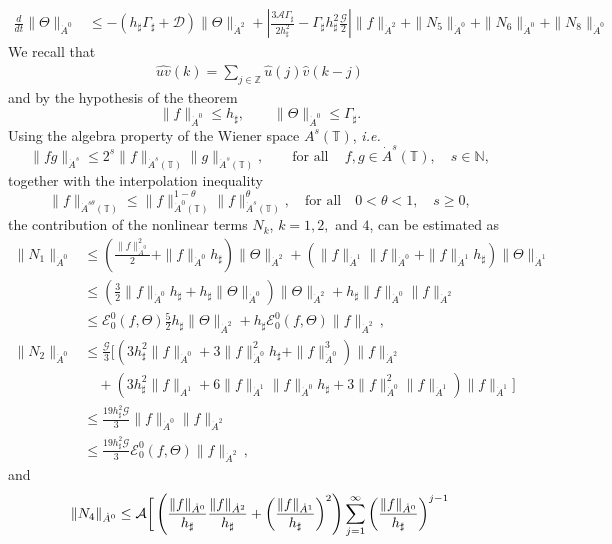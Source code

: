 \documentclass[reqno,11pt]{amsart}
\newcommand{\ZZ}{{\mathbb Z}}
\newcommand{\NN}{{\mathbb N}}
\newcommand{\TT}{{\mathbb T}}
\newcommand{\bh}{h_\sharp}
\newcommand{\bG}{\Gamma_\sharp}
\begin{document}
{\begin{align}
\frac{d}{dt}\|\Theta\|_{\dot A^0}&\leq-\left(\bh \bG+\mathcal{D}\right)\|\Theta\|_{\dot{A}^2}+\left|\frac{3\mathcal{A}\bG}{2\bh^2}-\bG\bh^2\frac{\mathcal{G}}{2}\right| \|f\|_{\dot{A}^2}+\|N_5\|_{\dot A^0}+\|N_6\|_{\dot A^0}+\|N_8\|_{\dot A^0}\label{eq:2}
\end{align}
We recall that
\begin{align*}
\widehat{uv}(k)=\sum_{j\in\ZZ}\hat{u}(j)\hat{v}(k-j)
\end{align*}
and by the hypothesis of the theorem
\[
	\|f\|_{\dot A^0}\leq \bh,\qquad \|\Theta\|_{\dot A^0}\leq \bG.
\]
Using the algebra property of the Wiener space $A^s(\TT)$, \emph{i.e.}
$$
\|fg\|_{\dot{A}^s}\leq 2^{s}\|f\|_{\dot{A}^s(\TT)}\|g\|_{\dot{A}^s(\TT)},\qquad \mbox{for all}\quad \, f,g\in \dot A^s(\TT),\quad s\in\NN,
$$
together with the interpolation inequality
$$
\|f\|_{\dot{A}^{s\theta}(\TT)}\leq \|f\|_{\dot A^0(\TT)}^{1-\theta}\|f\|_{\dot{A}^s(\TT)}^{\theta},\quad \mbox{for all} \quad 0<\theta<1,\quad s\geq0,
$$
the contribution of the nonlinear terms $N_k$, $k=1,2,$ and $4$, can be estimated as
\begin{align*}
\|N_1\|_{\dot A^0}&\leq \left(\frac{\|f\|_{\dot A^0}^2}{2}+\|f\|_{\dot A^0}\bh\right)\|\Theta\|_{\dot{A}^2}+\left(\|f\|_{\dot{A}^1}\|f\|_{\dot A^0}+\|f\|_{\dot{A}^1}\bh\right)\|\Theta\|_{\dot{A}^1}\\
&\leq \left(\frac{3}{2}\|f\|_{\dot A^0}\bh+\bh\|\Theta\|_{\dot A^0}\right)\|\Theta\|_{\dot{A}^2}+\bh\|f\|_{\dot A^0}\|f\|_{\dot{A}^2}\\
&\leq \mathscr{E}_0^0(f,\Theta) \frac{5}{2}\bh\|\Theta\|_{\dot{A}^2}+\bh\mathscr{E}_0^0(f,\Theta)\|f\|_{\dot{A}^2}\,,
\end{align*}
\begin{align*}
\|N_2\|_{\dot A^0}&\leq\frac{\mathcal{G}}{3}\bigg[\left(3\bh^2 \|f\|_{\dot A^0}+3\|f\|_{\dot A^0}^2\bh+\|f\|_{\dot A^0}^3\right)\|f\|_{\dot{A}^2}\\
&\quad+\left(3\bh^2 \|f\|_{A^1}+6\|f\|_{\dot{A}^1}\|f\|_{\dot A^0}\bh+3\|f\|_{\dot A^0}^2\|f\|_{\dot{A}^1}\right)\|f\|_{\dot{A}^1}\bigg]\\
&\leq\frac{19\bh^2\mathcal{ G}}{3} \|f\|_{\dot A^0}\|f\|_{\dot{A}^2}\\
&\leq \frac{19\bh^2\mathcal{ G}}{3} \mathscr{E}_0^0(f,\Theta)\|f\|_{\dot{A}^2}\,,
\end{align*}
and
\begin{align*}
\|N_4\|_{\dot A^0}&\leq\mathcal{A} \bigg{[}\left(\frac{\|f\|_{\dot A^0}}{\bh}\frac{\|f\|_{\dot{A}^2}}{\bh} +\left(\frac{\|f\|_{\dot{A}^1}}{\bh}\right)^2\right)\sum_{j=1}^\infty\left(\frac{\|f\|_{\dot A^0}}{\bh}\right)^{j-1}\\

\end{align*}}
\end{document}

